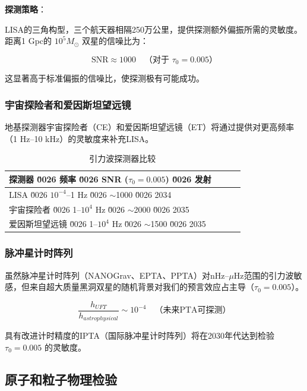 \textbf{探测策略}：

LISA的三角构型，三个航天器相隔250万公里，提供探测额外偏振所需的灵敏度。距离1 Gpc的 $10^5 M_\odot$ 双星的信噪比为：

\begin{equation}
    \text{SNR} \approx 1000 \quad \text{（对于 } \tau_0 = 0.005\text{）}
\end{equation}

这显著高于标准偏振的信噪比，使探测极有可能成功。

\subsubsection{宇宙探险者和爱因斯坦望远镜}

地基探测器宇宙探险者（CE）和爱因斯坦望远镜（ET）将通过提供对更高频率（1 Hz--10 kHz）的灵敏度来补充LISA。

\begin{table}[htbp]
\centering
\caption{引力波探测器比较}
\label{tab:gw_detectors}
\begin{tabular}{lccc}
\toprule
\textbf{探测器} \u0026 \textbf{频率} \u0026 \textbf{SNR (}$\tau_0=0.005$\textbf{)} \u0026 \textbf{发射} \\
\midrule
LISA \u0026 $10^{-4}$--1 Hz \u0026 $\sim$1000 \u0026 2034 \\
宇宙探险者 \u0026 1--$10^4$ Hz \u0026 $\sim$2000 \u0026 2035 \\
爱因斯坦望远镜 \u0026 1--$10^4$ Hz \u0026 $\sim$1500 \u0026 2035 \\
\bottomrule
\end{tabular}
\end{table}

\subsubsection{脉冲星计时阵列}

虽然脉冲星计时阵列（NANOGrav、EPTA、PPTA）对nHz--$\mu$Hz范围的引力波敏感，但来自超大质量黑洞双星的随机背景对我们的预言效应占主导（$\tau_0 = 0.005$）。

\begin{equation}
    \frac{h_{UFT}}{h_{astrophysical}} \sim 10^{-4} \quad \text{（未来PTA可探测）}
\end{equation}

具有改进计时精度的IPTA（国际脉冲星计时阵列）将在2030年代达到检验 $\tau_0 = 0.005$ 的灵敏度。

\subsection{原子和粒子物理检验}

